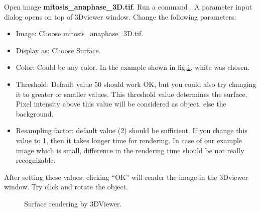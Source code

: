 \begin{indentexercise}{2}
Open image \textbf{mitosis\_anaphase\_3D.tif}.
Run a command . A parameter input dialog opens on top of 3Dviewer window. Change the following parameters:
\begin{itemize}
\item Image: Choose mitosis\_anaphase\_3D.tif.
\item Display as: Choose Surface.
\item Color: Could be any color. In the example shown in fig.\ref{fig:3DviewerSurface}, white was chosen. 
\item Threshold: Default value 50 should work OK, but you could also try changing it to greater or smaller values. This threshold value determines the surface. Pixel intensity above this value will be considered as object, else the background. 
\item Resampling factor: default value (2) should be sufficient. If you change this value to 1, then it takes longer time for rendering. In case of our example image which is small, difference in the rendering time should be not really recognizable. 
\end{itemize}

After setting these values, clicking ``OK'' will render the image in the 3Dviewer window. Try click and rotate the object. 

\begin{figure}[h!]
 \centering
 \quad
 \caption{Surface rendering by 3DViewer.}
 \label{fig:3DviewerSurface}
\end{figure}
\end{indentexercise}

